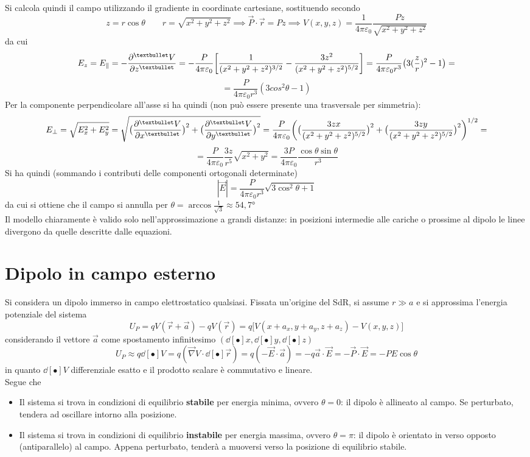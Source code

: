 Si calcola quindi il campo utilizzando il gradiente in coordinate cartesiane, sostituendo secondo
\[z = r \cos \theta \qquad r = \sqrt{x^2 + y^2 + z^2} \implies \vec{P} \cdot \vec{r} = P z \implies V(x,y,z) = \frac{1}{4 \pi \varepsilon_0} \frac{Pz}{\sqrt{x^2 + y^2 + z^2}}\]
da cui
\[E_z = E_\parallel = - \pdv[•]{V}{z} = - \frac{P}{4 \pi \varepsilon_0} \bigg[\frac{1}{(x^2 + y^2 + z^2)^{3/2}} - \frac{3 z^2}{(x^2 + y^2 + z^2)^{5/2}}\bigg] = \frac{P}{4 \pi \varepsilon_0 r^3} \big(3 (\frac{z}{r})^2 - 1\big) = \]
\[= \frac{P}{4 \pi \varepsilon_0 r^3} (3 cos^2 \theta - 1)\]
Per la componente perpendicolare all'asse si ha quindi (non può essere presente una trasversale per simmetria):
\[E_\perp = \sqrt{E_x^2 + E_y^2} = \sqrt{\big(\pdv[•]{V}{x}\big)^2 + \big(\pdv[•]{V}{y}\big)^2} = \frac{P}{4 \pi \varepsilon_0} \bigg(\big(\frac{3zx}{(x^2 + y^2 + z^2)^{5/2}}\big)^2 + \big(\frac{3zy}{(x^2 + y^2 + z^2)^{5/2}}\big)^2\bigg)^{1/2} = \]
\[= \frac{P}{4 \pi \varepsilon_0} \frac{3z}{r^5} \sqrt{x^2 + y^2} = \frac{3P}{4 \pi \varepsilon_0} \frac{\cos \theta \sin \theta}{r^3}\]
Si ha quindi (sommando i contributi delle componenti ortogonali determinate)
\[|\vec{E}| = \frac{P}{4 \pi \varepsilon_0 r^3} \sqrt{3 \cos^2 \theta + 1}\]
da cui si ottiene che il campo si annulla per $\theta = \arccos \frac{1}{\sqrt{3}} \approx 54,7°$
\\Il modello chiaramente è valido solo nell'approssimazione a grandi distanze: in posizioni intermedie alle cariche o prossime al dipolo le linee divergono da quelle descritte dalle equazioni.

\section{Dipolo in campo esterno}
Si considera un dipolo immerso in campo elettrostatico qualsiasi. Fissata un'origine del SdR, si assume $r \gg a$ e si approssima l'energia potenziale del sistema
\[U_P = q V(\vec{r} + \vec{a}) - q V(\vec{r}) = q \big[V(x + a_x, y + a_y, z + a_z) - V(x,y,z)\big]\]
considerando il vettore $\vec{a}$ come spostamento infinitesimo $(\dd[•]{x}, \dd[•]{y}, \dd[•]{z})$
\[U_P \approx q \dd[•]{V} = q (\vec{\nabla} V \cdot \dd[•]{\vec{r}}) = q (- \vec{E} \cdot \vec{a}) = - q \vec{a} \cdot \vec{E} = - \vec{P} \cdot \vec{E} = - P E \cos \theta\]
in quanto $\dd[•]{V}$ differenziale esatto e il prodotto scalare è commutativo e lineare.
\\Segue che
\begin{itemize}
\item Il sistema si trova in condizioni di equilibrio \textbf{stabile} per energia minima, ovvero $\theta = 0$: il dipolo è allineato al campo. Se perturbato, tendera ad oscillare intorno alla posizione.
\item Il sistema si trova in condizioni di equilibrio \textbf{instabile} per energia massima, ovvero $\theta = \pi$: il dipolo è orientato in verso opposto (antiparallelo) al campo. Appena perturbato, tenderà a muoversi verso la posizione di equilibrio stabile.
\end{itemize}

